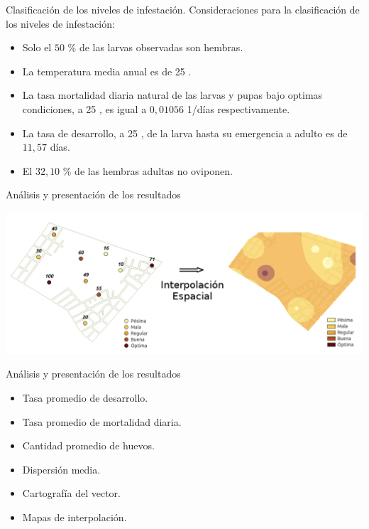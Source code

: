 \begin{frame}[t]{Clasificación de los niveles de infestación.}
  Consideraciones para la clasificación de los niveles de infestación:
  \begin{itemize}
      \item Solo el $50$ \% de las larvas observadas son hembras.
      \item La temperatura media anual es de 25 \textcelsius.
      \item La tasa mortalidad diaria natural de las larvas y pupas bajo optimas condiciones, a 25 \textcelsius, es igual a $0,01056$ 1/días respectivamente.
      \item La tasa de desarrollo, a 25 \textcelsius, de la larva hasta su emergencia a adulto es de $11,57$ días.
      \item El $32,10$ \% de las hembras adultas no oviponen.
  \end{itemize}
\end{frame}


\begin{frame}[c]{Análisis y presentación de los resultados}
  \begin{center}
      \includegraphics[width=\textwidth]{./graphics/identificacion-focos.png}
  \end{center}
\end{frame}


\begin{frame}[t]{Análisis y presentación de los resultados}
  \begin{center}
      \begin{itemize}
        \item Tasa promedio de desarrollo.
        \item Tasa promedio de mortalidad diaria.
        \item Cantidad promedio de huevos.
        \item Dispersión media.
        \item Cartografía del vector.
        \item Mapas de interpolación.
      \end{itemize}
  \end{center}
\end{frame}

